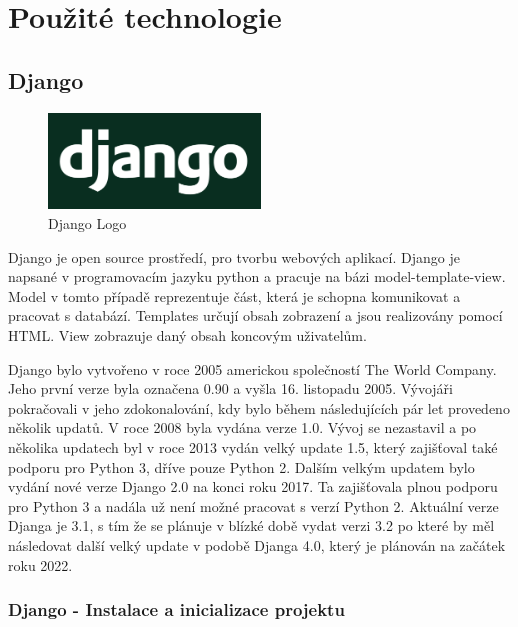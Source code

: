 \chapter{Použité technologie}
\label{2-technologie}

\section{Django}

\begin{figure}[H] \centering
    \includegraphics[width=160pt]{./pictures/django-logo.png}
    \caption[Django Logo]{Django Logo \cite{}}
	\label{fig:Django Logo}                                
\end{figure}

Django je open source prostředí, pro tvorbu webových aplikací. Django je napsané v programovacím jazyku python a pracuje na bázi model-template-view. Model v tomto případě reprezentuje část, která je schopna komunikovat a pracovat s databází. Templates určují obsah zobrazení a jsou realizovány pomocí HTML. View zobrazuje daný obsah koncovým uživatelům. 

Django bylo vytvořeno v roce 2005 americkou společností The World Company. Jeho první verze byla označena 0.90 a vyšla 16. listopadu 2005. Vývojáři pokračovali v jeho zdokonalování, kdy bylo během následujících pár let provedeno několik updatů. V roce 2008 byla vydána verze 1.0. Vývoj se nezastavil a po několika updatech byl v roce 2013 vydán velký update 1.5, který zajišťoval také podporu pro Python 3, dříve pouze Python 2. Dalším velkým updatem bylo vydání nové verze Django 2.0 na konci roku 2017. Ta zajišťovala plnou podporu pro Python 3 a nadála už není možné pracovat s verzí Python 2. Aktuální verze Djanga je 3.1, s tím že se plánuje v blízké době vydat verzi 3.2 po které by měl následovat další velký update v podobě Djanga 4.0, který je plánován na začátek roku 2022.

\newpage


\subsection{Django - Instalace a inicializace projektu}

